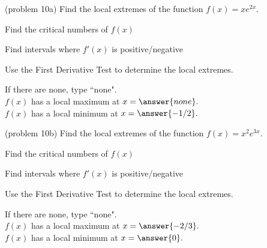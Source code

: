 \documentclass{ximera}
\begin{document}
\begin{example}[example 10]
\begin{image}
\end{image}
\end{example}

\begin{problem}(problem 10a)
Find the local extremes of the function $f(x) = xe^{2x}.$\\
\begin{hint}
Find the critical numbers of $f(x)$
\end{hint}
\begin{hint}
Find intervals where $f'(x)$ is positive/negative
\end{hint}
\begin{hint}
Use the First Derivative Test to determine the local extremes.
\end{hint}

If there are none, type ``none".\\
$f(x)$ has a local maximum at $x = \answer{none}.$\\
$f(x)$ has a local minimum at $x = \answer{-1/2}.$
\end{problem}


\begin{problem}(problem 10b)
Find the local extremes of the function $f(x) = x^2e^{3x}.$\\
\begin{hint}
Find the critical numbers of $f(x)$
\end{hint}
\begin{hint}
Find intervals where $f'(x)$ is positive/negative
\end{hint}
\begin{hint}
Use the First Derivative Test to determine the local extremes.
\end{hint}

If there are none, type ``none".\\
$f(x)$ has a local maximum at $x = \answer{-2/3}.$\\
$f(x)$ has a local minimum at $x = \answer{0}.$
\end{problem}
\end{document}
